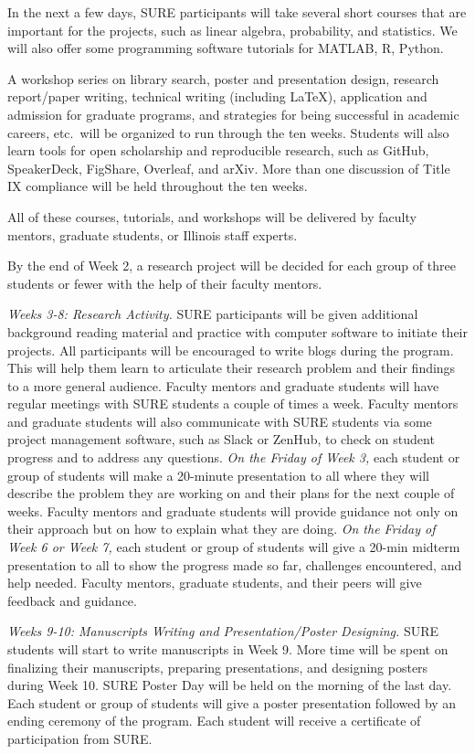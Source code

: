 \documentclass[11pt]{NSFamsart}
\begin{document}
In the next a few days,
SURE participants will take several short courses that are important for the projects, such as linear algebra, probability, and statistics. We will also offer some programming software tutorials for MATLAB, R, Python.

A workshop series on library search, poster and presentation design,
research report/paper writing, technical writing (including LaTeX), application and admission for
graduate programs, and strategies for being successful in academic careers, etc.\ will be organized to run through the ten weeks.  Students will also learn tools for open scholarship and reproducible research, such as GitHub, SpeakerDeck, FigShare, Overleaf, and arXiv.   More than one discussion of Title IX compliance will be held throughout the ten weeks.  

All of these courses, tutorials, and workshops will be delivered by faculty mentors, graduate students, or Illinois staff experts.

By the end of Week 2, a research project will be decided for each group of three students or fewer with the help of their faculty mentors.

\noindent \emph{Weeks 3-8: Research Activity.}
SURE participants will be given additional background
reading material and practice with computer software to initiate their projects. All participants will be encouraged to write blogs \cite{Hig21a} during the program. This will help them learn to articulate their research problem and their findings to a more general audience. Faculty mentors and graduate
students will have regular meetings with SURE students a couple of times a week. Faculty mentors and graduate students will also communicate with SURE students via some project management software, such as Slack or ZenHub, to check on student progress and to address any questions. 
\emph{On the Friday of Week 3,}
each student or group of students will make a 20-minute presentation to all where they will describe the problem they are working on and their plans for the next couple of weeks. Faculty mentors and
graduate students will provide guidance not only on their approach but on how to explain what they are doing.
\emph{On the Friday of Week 6 or Week 7,}
each student or group of students will give a 20-min midterm presentation to all to show the progress made so far, challenges encountered, and help needed. Faculty mentors,
graduate students, and their peers will give feedback and guidance.

\noindent \emph{Weeks 9-10: Manuscripts Writing and Presentation/Poster Designing.} SURE students will start to
write manuscripts in Week 9. More time will be spent on finalizing their manuscripts, preparing presentations, and designing posters during Week 10. SURE Poster Day will be held on the morning of the last day. Each student or group of students will give a poster presentation followed by an ending ceremony of the program. Each student will receive a certificate of participation from  SURE.
\end{document}
